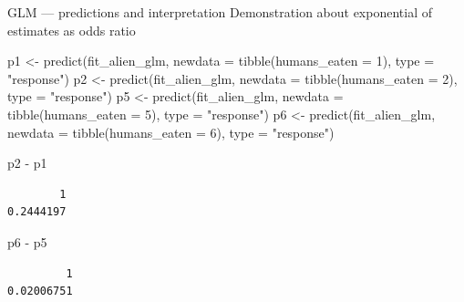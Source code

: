\documentclass[
  10pt,
  ignorenonframetext,
  aspectratio=169,
  t]{beamer}
\newenvironment{Shaded}{\begin{snugshade}}{\end{snugshade}}
\newcommand{\AttributeTok}[1]{\textcolor[rgb]{0.40,0.45,0.13}{#1}}
\newcommand{\DecValTok}[1]{\textcolor[rgb]{0.68,0.00,0.00}{#1}}
\newcommand{\FunctionTok}[1]{\textcolor[rgb]{0.28,0.35,0.67}{#1}}
\newcommand{\NormalTok}[1]{\textcolor[rgb]{0.00,0.23,0.31}{#1}}
\newcommand{\OtherTok}[1]{\textcolor[rgb]{0.00,0.23,0.31}{#1}}
\newcommand{\SpecialCharTok}[1]{\textcolor[rgb]{0.37,0.37,0.37}{#1}}
\newcommand{\StringTok}[1]{\textcolor[rgb]{0.13,0.47,0.30}{#1}}
\begin{document}
\begin{frame}[fragile]{GLM --- predictions and interpretation}
\protect{}\label{glm-predictions-and-interpretation-3}
Demonstration about exponential of estimates as odds ratio

\footnotesize

\begin{Shaded}
\begin{Highlighting}[]
\NormalTok{p1 }\OtherTok{\textless{}{-}} \FunctionTok{predict}\NormalTok{(fit\_alien\_glm, }\AttributeTok{newdata =} \FunctionTok{tibble}\NormalTok{(}\AttributeTok{humans\_eaten =} \DecValTok{1}\NormalTok{), }\AttributeTok{type =} \StringTok{"response"}\NormalTok{)}
\NormalTok{p2 }\OtherTok{\textless{}{-}} \FunctionTok{predict}\NormalTok{(fit\_alien\_glm, }\AttributeTok{newdata =} \FunctionTok{tibble}\NormalTok{(}\AttributeTok{humans\_eaten =} \DecValTok{2}\NormalTok{), }\AttributeTok{type =} \StringTok{"response"}\NormalTok{)}
\NormalTok{p5 }\OtherTok{\textless{}{-}} \FunctionTok{predict}\NormalTok{(fit\_alien\_glm, }\AttributeTok{newdata =} \FunctionTok{tibble}\NormalTok{(}\AttributeTok{humans\_eaten =} \DecValTok{5}\NormalTok{), }\AttributeTok{type =} \StringTok{"response"}\NormalTok{)}
\NormalTok{p6 }\OtherTok{\textless{}{-}} \FunctionTok{predict}\NormalTok{(fit\_alien\_glm, }\AttributeTok{newdata =} \FunctionTok{tibble}\NormalTok{(}\AttributeTok{humans\_eaten =} \DecValTok{6}\NormalTok{), }\AttributeTok{type =} \StringTok{"response"}\NormalTok{)}

\NormalTok{p2 }\SpecialCharTok{{-}}\NormalTok{ p1}
\end{Highlighting}
\end{Shaded}

\begin{verbatim}
        1 
0.2444197 
\end{verbatim}

\begin{Shaded}
\begin{Highlighting}[]
\NormalTok{p6 }\SpecialCharTok{{-}}\NormalTok{ p5}
\end{Highlighting}
\end{Shaded}

\begin{verbatim}
         1 
0.02006751 
\end{verbatim}

\normalsize
\end{frame}
\end{document}
